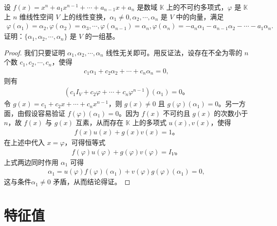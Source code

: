 \documentclass[lang=cn,newtx,10pt,scheme=chinese]{elegantbook}
\begin{document}
\begin{proposition}
设 $f(x) = x^n + a_1 x^{n-1} + \cdots + a_{n-1} x + a_n$ 是数域 $\mathbb{K}$ 上的不可约多项式，$\varphi$ 是 $\mathbb{K}$ 上 $n$ 维线性空间 $V$ 上的线性变换，$\alpha_1 \neq 0, \alpha_2, \cdots, \alpha_n$ 是 $V$ 中的向量，满足
\begin{align*}
\varphi (\alpha _1)=\alpha _2,\varphi (\alpha _2)=\alpha _3,\cdots ,\varphi (\alpha _{n-1})=\alpha _n,\varphi (\alpha _n)=-a_n\alpha _1-a_{n-1}\alpha _2-\cdots -a_1\alpha _n.
\end{align*}
证明：$\{\alpha_1, \alpha_2, \cdots, \alpha_n\}$ 是 $V$ 的一组基。
\end{proposition}
\begin{proof}
我们只要证明 $\alpha_1, \alpha_2, \cdots, \alpha_n$ 线性无关即可。用反证法，设存在不全为零的 $n$ 个数 $c_1, c_2, \cdots, c_n$，使得
\begin{align*}
c_1 \alpha_1 + c_2 \alpha_2 + \cdots + c_n \alpha_n = 0,
\end{align*}
则有
\begin{align*}
(c_1 I_V + c_2 \varphi + \cdots + c_n \varphi^{n-1})(\alpha_1) = 0。
\end{align*}
令 $g(x) = c_1 + c_2 x + \cdots + c_n x^{n-1}$，则 $g(x) \neq 0$ 且 $g(\varphi)(\alpha_1) = 0$。另一方面，由假设容易验证 $f(\varphi)(\alpha_1) = 0$。因为 $f(x)$ 不可约且 $g(x)$ 的次数小于 $n$，故 $f(x)$ 与 $g(x)$ 互素，从而存在 $\mathbb{K}$ 上的多项式 $u(x), v(x)$，使得
\begin{align*}
f(x)u(x) + g(x)v(x) = 1。
\end{align*}
在上述中代入 $x = \varphi$，可得恒等式
\begin{align*}
f(\varphi)u(\varphi) + g(\varphi)v(\varphi) = I_V。
\end{align*}
上式两边同时作用 $\alpha_1$ 可得
\begin{align*}
\alpha_1 = u(\varphi)f(\varphi)(\alpha_1) + v(\varphi)g(\varphi)(\alpha_1) = 0,
\end{align*}
这与条件$\alpha_1 \neq 0$ 矛盾，从而结论得证。
\end{proof}












\chapter{特征值}
\end{document}
